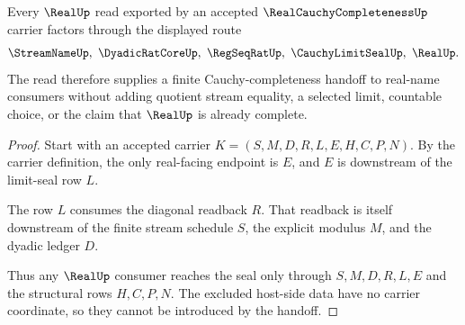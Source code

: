 \begin{theorem}
\label{thm:real-cauchy-completeness-seal-nonescape}
Every $\RealUp$ read exported by an accepted $\RealCauchyCompletenessUp$ carrier factors through the displayed route
$$
\StreamNameUp,\ \DyadicRatCoreUp,\ \RegSeqRatUp,\ \CauchyLimitSealUp,\ \RealUp .
$$
The read therefore supplies a finite Cauchy-completeness handoff to real-name consumers without adding quotient stream equality, a selected limit, countable choice, or the claim that $\RealUp$ is already complete.
\end{theorem}
\begin{proof}
Start with an accepted carrier $K=(S,M,D,R,L,E,H,C,P,N)$. By the carrier definition, the only real-facing endpoint is $E$, and $E$ is downstream of the limit-seal row $L$.

The row $L$ consumes the diagonal readback $R$. That readback is itself downstream of the finite stream schedule $S$, the explicit modulus $M$, and the dyadic ledger $D$.

Thus any $\RealUp$ consumer reaches the seal only through $S,M,D,R,L,E$ and the structural rows $H,C,P,N$. The excluded host-side data have no carrier coordinate, so they cannot be introduced by the handoff.
\end{proof}

